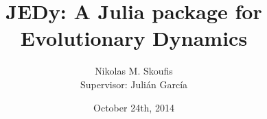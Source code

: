 \documentclass[a4paper,11pt]{article}
\begin{document}
\title{JEDy: A Julia package for Evolutionary Dynamics}
\author{Nikolas M. Skoufis \\ Supervisor: Julián García}
\date{October 24th, 2014}

\maketitle






\end{document}
